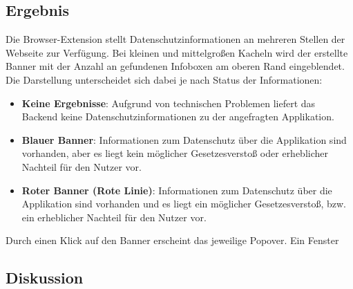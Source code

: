 \subsection{Ergebnis}
\label{ss:ergebnisseht1}

Die Browser-Extension stellt Datenschutzinformationen an mehreren Stellen der Webseite zur Verfügung. Bei kleinen und mittelgroßen Kacheln wird der erstellte Banner mit der Anzahl an gefundenen Infoboxen am oberen Rand eingeblendet. Die Darstellung unterscheidet sich dabei je nach Status der Informationen:

\begin{itemize}
	\item \textbf{\glqq Keine Ergebnisse\grqq{}}:
	Aufgrund von technischen Problemen liefert das Backend keine Datenschutzinformationen zu der angefragten Applikation.
	\item \textbf{Blauer Banner}:
	Informationen zum Datenschutz über die Applikation sind vorhanden, aber es liegt kein möglicher Gesetzesverstoß oder erheblicher Nachteil für den Nutzer vor.
	\item \textbf{Roter Banner (\glqq Rote Linie\grqq{})}:
	Informationen zum Datenschutz über die Applikation sind vorhanden und es liegt ein möglicher Gesetzesverstoß, bzw. ein erheblicher Nachteil für den Nutzer vor.
\end{itemize}


Durch einen Klick auf den Banner erscheint das jeweilige Popover. Ein Fenster 

\subsection{Diskussion}
\label{ss:diskussionht1}










